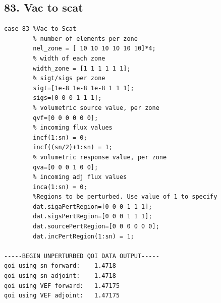 \documentclass{article}
\begin{document}
\subsection{83. Vac to scat}
\begin{verbatim}
case 83 %Vac to Scat
        % number of elements per zone
        nel_zone = [ 10 10 10 10 10 10]*4;
        % width of each zone
        width_zone = [1 1 1 1 1 1];
        % sigt/sigs per zone
        sigt=[1e-8 1e-8 1e-8 1 1 1];
        sigs=[0 0 0 1 1 1];
        % volumetric source value, per zone
        qvf=[0 0 0 0 0 0];
        % incoming flux values
        incf(1:sn) = 0;
        incf((sn/2)+1:sn) = 1;
        % volumetric response value, per zone
        qva=[0 0 0 1 0 0];
        % incoming adj flux values
        inca(1:sn) = 0;
        %Regions to be perturbed. Use value of 1 to specify
        dat.sigaPertRegion=[0 0 0 1 1 1];
        dat.sigsPertRegion=[0 0 0 1 1 1];
        dat.sourcePertRegion=[0 0 0 0 0 0];
        dat.incPertRegion(1:sn) = 1;
        
-----BEGIN UNPERTURBED QOI DATA OUTPUT----- 
qoi using sn forward: 	 1.4718 
qoi using sn adjoint: 	 1.4718 
qoi using VEF forward: 	 1.47175 
qoi using VEF adjoint: 	 1.47175 
\end{verbatim}
\end{document}
